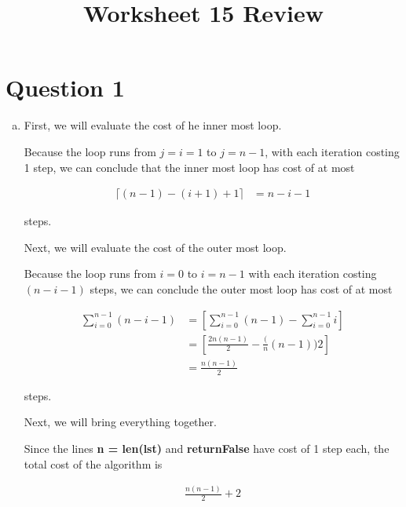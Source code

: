 \documentclass[12pt]{article}
\begin{document}
\title{Worksheet 15 Review}
\maketitle

\section*{Question 1}
\begin{enumerate}[a.]
    \item

    First, we will evaluate the cost of he inner most loop.

    \bigskip

    Because the loop runs from $j = i = 1$ to $j = n - 1$, with each iteration costing
    1 step, we can conclude that the inner most loop has cost of at most

    \begin{align}
        \lceil (n-1) - (i + 1) + 1 \rceil &= n - i - 1
    \end{align}

    steps.

    \bigskip

    Next, we will evaluate the cost of the outer most loop.

    \bigskip

    Because the loop runs from $i = 0$ to $i = n - 1$ with each iteration
    costing $(n - i - 1)$ steps, we can conclude the outer most loop has cost of
    at most

    \begin{align}
        \sum\limits_{i=0}^{n-1} (n - i - 1) &= \left[ \sum\limits_{i=0}^{n-1} (n-1) - \sum\limits_{i=0}^{n-1} i \right]\\
        &= \left[ \frac{2n(n-1)}{2} - \frac(n(n-1)){2} \right]\\
        &= \frac{n(n-1)}{2}
    \end{align}

    steps.

    \bigskip

    Next, we will bring everything together.

    \bigskip

    Since the lines \textbf{n = len(lst)} and \textbf{return\:False} have cost of 1 step each,
    the total cost of the algorithm is

    \begin{align}
        \frac{n(n-1)}{2} + 2
    \end{align}


\end{enumerate}
\end{document}
